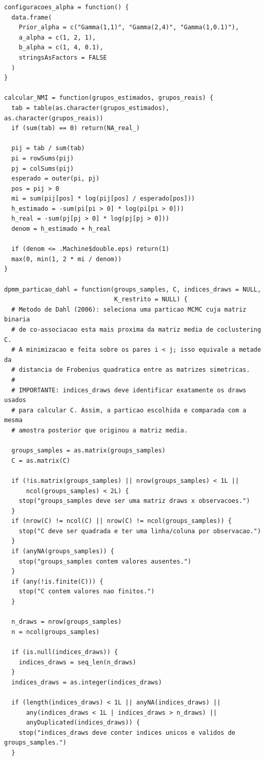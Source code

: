 \begin{verbatim}
configuracoes_alpha = function() {
  data.frame(
    Prior_alpha = c("Gamma(1,1)", "Gamma(2,4)", "Gamma(1,0.1)"),
    a_alpha = c(1, 2, 1),
    b_alpha = c(1, 4, 0.1),
    stringsAsFactors = FALSE
  )
}

calcular_NMI = function(grupos_estimados, grupos_reais) {
  tab = table(as.character(grupos_estimados), as.character(grupos_reais))
  if (sum(tab) == 0) return(NA_real_)
  
  pij = tab / sum(tab)
  pi = rowSums(pij)
  pj = colSums(pij)
  esperado = outer(pi, pj)
  pos = pij > 0
  mi = sum(pij[pos] * log(pij[pos] / esperado[pos]))
  h_estimado = -sum(pi[pi > 0] * log(pi[pi > 0]))
  h_real = -sum(pj[pj > 0] * log(pj[pj > 0]))
  denom = h_estimado + h_real
  
  if (denom <= .Machine$double.eps) return(1)
  max(0, min(1, 2 * mi / denom))
}

dpmm_particao_dahl = function(groups_samples, C, indices_draws = NULL,
                              K_restrito = NULL) {
  # Metodo de Dahl (2006): seleciona uma particao MCMC cuja matriz binaria
  # de co-associacao esta mais proxima da matriz media de coclustering C.
  # A minimizacao e feita sobre os pares i < j; isso equivale a metade da
  # distancia de Frobenius quadratica entre as matrizes simetricas.
  #
  # IMPORTANTE: indices_draws deve identificar exatamente os draws usados
  # para calcular C. Assim, a particao escolhida e comparada com a mesma
  # amostra posterior que originou a matriz media.
  
  groups_samples = as.matrix(groups_samples)
  C = as.matrix(C)
  
  if (!is.matrix(groups_samples) || nrow(groups_samples) < 1L ||
      ncol(groups_samples) < 2L) {
    stop("groups_samples deve ser uma matriz draws x observacoes.")
  }
  if (nrow(C) != ncol(C) || nrow(C) != ncol(groups_samples)) {
    stop("C deve ser quadrada e ter uma linha/coluna por observacao.")
  }
  if (anyNA(groups_samples)) {
    stop("groups_samples contem valores ausentes.")
  }
  if (any(!is.finite(C))) {
    stop("C contem valores nao finitos.")
  }
  
  n_draws = nrow(groups_samples)
  n = ncol(groups_samples)
  
  if (is.null(indices_draws)) {
    indices_draws = seq_len(n_draws)
  }
  indices_draws = as.integer(indices_draws)
  
  if (length(indices_draws) < 1L || anyNA(indices_draws) ||
      any(indices_draws < 1L | indices_draws > n_draws) ||
      anyDuplicated(indices_draws)) {
    stop("indices_draws deve conter indices unicos e validos de groups_samples.")
  }
  

\end{verbatim}
